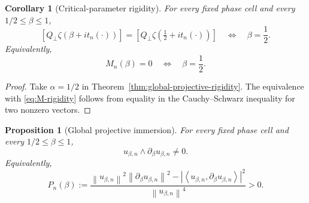 \documentclass[11pt]{amsart}
\numberwithin{equation}{section}
\newtheorem{proposition}[theorem]{Proposition}
\newtheorem{corollary}[theorem]{Corollary}
\newcommand{\ip}[2]{\left\langle #1,#2\right\rangle}
\newcommand{\norm}[1]{\left\lVert #1\right\rVert}
\begin{document}
\begin{corollary}[Critical-parameter rigidity]
\label{cor:critical-parameter-rigidity}
For every fixed phase cell and every $1/2\leq\beta\leq1$,
\begin{equation}
 \boxed{
 [Q_\perp\zeta(\beta+i t_n(\cdot))]
 =
 [Q_\perp\zeta(\tfrac12+i t_n(\cdot))]
 \quad\Longleftrightarrow\quad
 \beta=\frac12.
 }
 \label{eq:critical-parameter-rigidity}
\end{equation}
Equivalently,
\begin{equation}
 \boxed{M_n(\beta)=0\quad\Longleftrightarrow\quad\beta=\frac12.}
 \label{eq:M-rigidity}
\end{equation}
\end{corollary}

\begin{proof}
Take $\alpha=1/2$ in Theorem~\ref{thm:global-projective-rigidity}.
The equivalence with \eqref{eq:M-rigidity} follows from equality in the
Cauchy--Schwarz inequality for two nonzero vectors.
\end{proof}

\begin{proposition}[Global projective immersion]
\label{prop:projective-immersion}
For every fixed phase cell and every $1/2\leq\beta\leq1$,
\begin{equation}
 u_{\beta,n}\wedge\partial_\beta u_{\beta,n}\neq0.
 \label{eq:projective-immersion}
\end{equation}
Equivalently,
\begin{equation}
 P_n(\beta):=
 \frac{
 \norm{u_{\beta,n}}^2\norm{\partial_\beta u_{\beta,n}}^2
 -|\ip{u_{\beta,n}}{\partial_\beta u_{\beta,n}}|^2}
 {\norm{u_{\beta,n}}^4}>0.
 \label{eq:projective-speed}
\end{equation}
\end{proposition}
\end{document}
